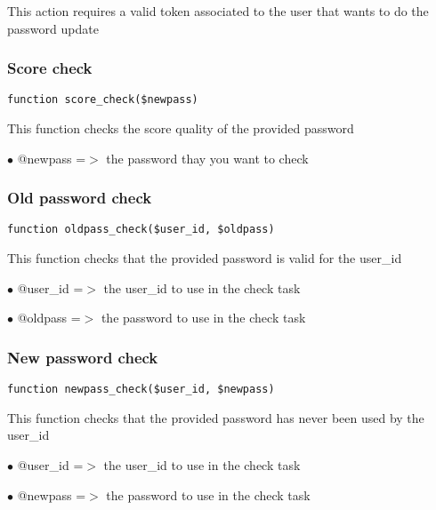\documentclass[a4paper]{article}
\begin{document}
This action requires a valid token associated to the user that wants to do
the password update

\hypertarget{toc379}{}
\subsubsection{Score check}

\begin{lstlisting}
function score_check($newpass)
\end{lstlisting}

This function checks the score quality of the provided password

\begin{compactitem}
\item[\color{myblue}$\bullet$] @newpass =$>$ the password thay you want to check
\end{compactitem}

\hypertarget{toc380}{}
\subsubsection{Old password check}

\begin{lstlisting}
function oldpass_check($user_id, $oldpass)
\end{lstlisting}

This function checks that the provided password is valid for the user\_id

\begin{compactitem}
\item[\color{myblue}$\bullet$] @user\_id =$>$ the user\_id to use in the check task
\item[\color{myblue}$\bullet$] @oldpass =$>$ the password to use in the check task
\end{compactitem}

\hypertarget{toc381}{}
\subsubsection{New password check}

\begin{lstlisting}
function newpass_check($user_id, $newpass)
\end{lstlisting}

This function checks that the provided password has never been used by the user\_id

\begin{compactitem}
\item[\color{myblue}$\bullet$] @user\_id =$>$ the user\_id to use in the check task
\item[\color{myblue}$\bullet$] @newpass =$>$ the password to use in the check task
\end{compactitem}
\end{document}
